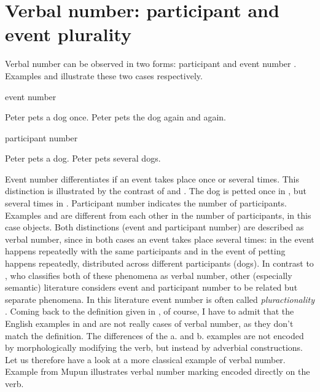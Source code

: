 \documentclass[output=paper,colorlinks,citecolor=brown
]{langscibook}
\begin{document}
\section{Verbal number: participant and event plurality}\label{sec:fiebig:partNum}

Verbal number can be observed in two forms: participant and event number \citep{Corbett2000}. Examples  and  illustrate these two cases respectively.

\ea event number \label{ex:fiebig:event}
\begin{xlist} 
\ex Peter pets a dog once. \label{ex:fiebig:eventA}
\ex Peter pets the dog again and again. \label{ex:fiebig:eventB}
\end{xlist}
\z 


\ea participant number \label{ex:fiebig:part}
\begin{xlist} 
\ex Peter pets a dog. \label{ex:fiebig:partA}
\ex Peter pets several dogs. \label{ex:fiebig:partB}
\end{xlist}
\z

\noindent Event number differentiates if an event takes place once or several times. This distinction is illustrated by the contrast of  and . The dog is petted once in , but several times in . Participant number indicates the number of participants. Examples  and  are different from each other in the number of participants, in this case objects. Both distinctions (event and participant number) are described as verbal number, since in both cases an event takes place several times: in  the event happens repeatedly with the same participants and in  the event of petting happens repeatedly, distributed across different participants (dogs). In contrast to \citet{Corbett2000}, who classifies both of these phenomena as verbal number, other (especially semantic) literature considers event and participant number to be related but separate phenomena. In this literature event number is often called \textit{pluractionality} \citep[e.g.][]{Henderson2012, Wood2007}.
Coming back to the definition given in , of course, I have to admit that the English examples in  and  are not really cases of verbal number, as they don't match the definition.
The differences of the a. and b. examples are not encoded by morphologically modifying the verb, but instead by adverbial constructions. Let us therefore have a look at a more classical example of verbal number. Example  from Mupun illustrates verbal number marking encoded directly on the verb.
\end{document}
